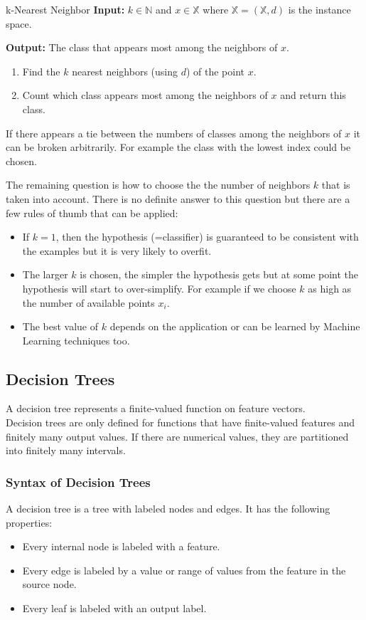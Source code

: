 \documentclass[english]{panikzettel}
\begin{document}
\begin{algo}{k-Nearest Neighbor}
\textbf{Input:} $k\in\mathbb{N}$ and $x\in \mathbb{X}$ where $\mathbb{X}=(\mathbb{X}, d)$ is the instance space.

\textbf{Output:} The class that appears most among the neighbors of $x$.
\tcblower
\begin{enumerate}
\item Find the $k$ nearest neighbors (using $d$) of the point $x$.
\item Count which class appears most among the neighbors of $x$ and return this class.
\end{enumerate}
\end{algo}

If there appears a tie between the numbers of classes among the neighbors of $x$ it can be broken arbitrarily. For example the class with the lowest index could be chosen.

The remaining question is how to choose the the number of neighbors $k$ that is taken into account. There is no definite answer to this question but there are a few rules of thumb that can be applied:
\begin{itemize}
\item If $k=1$, then the hypothesis (=classifier) is guaranteed to be consistent with the examples but it is very likely to overfit.
\item The larger $k$ is chosen, the simpler the hypothesis gets but at some point the hypothesis will start to over-simplify. For example if we choose $k$ as high as the number of available points $x_i$.
\item The best value of $k$ depends on the application or can be learned by Machine Learning techniques too.
\end{itemize}


\subsection{Decision Trees}
\label{syntax_dec_trees}
A decision tree represents a finite-valued function on feature vectors.\\
Decision trees are only defined for functions that have finite-valued features and finitely many output values. If there are numerical values, they are partitioned into finitely many intervals.

\subsubsection{Syntax of Decision Trees}
A decision tree is a tree with labeled nodes and edges. It has the following properties:
\begin{itemize}
\item Every internal node is labeled with a feature.
\item Every edge is labeled by a value or range of values from the feature in the source node.
\item Every leaf is labeled with an output label.
\end{itemize}
\end{document}
